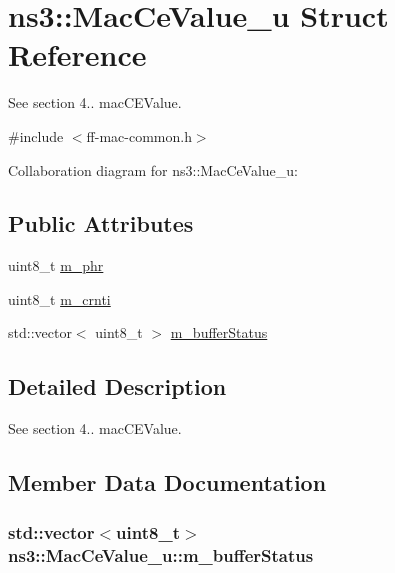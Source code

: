 \hypertarget{structns3_1_1MacCeValue__u}{}\section{ns3\+:\+:Mac\+Ce\+Value\+\_\+u Struct Reference}
\label{structns3_1_1MacCeValue__u}


See section 4.. mac\+C\+E\+Value.  




{\ttfamily \#include $<$ff-\/mac-\/common.\+h$>$}



Collaboration diagram for ns3\+:\+:Mac\+Ce\+Value\+\_\+u\+:
\subsection*{Public Attributes}
\begin{DoxyCompactItemize}
\item 
uint8\+\_\+t \hyperlink{structns3_1_1MacCeValue__u_ad5ac5b7e1390356c0f0ea4a52589b9fd}{m\+\_\+phr}
\item 
uint8\+\_\+t \hyperlink{structns3_1_1MacCeValue__u_aa8c2e4e1bdc174ac3670612c15d880b7}{m\+\_\+crnti}
\item 
std\+::vector$<$ uint8\+\_\+t $>$ \hyperlink{structns3_1_1MacCeValue__u_a18f2334dc18c7517037b3974b50e806c}{m\+\_\+buffer\+Status}
\end{DoxyCompactItemize}


\subsection{Detailed Description}
See section 4.. mac\+C\+E\+Value. 

\subsection{Member Data Documentation}
\subsubsection[{\texorpdfstring{m\+\_\+buffer\+Status}{m_bufferStatus}}]{\setlength{\rightskip}{0pt plus 5cm}std\+::vector$<$uint8\+\_\+t$>$ ns3\+::\+Mac\+Ce\+Value\+\_\+u\+::m\+\_\+buffer\+Status}\hypertarget{structns3_1_1MacCeValue__u_a18f2334dc18c7517037b3974b50e806c}{}\label{structns3_1_1MacCeValue__u_a18f2334dc18c7517037b3974b50e806c}
